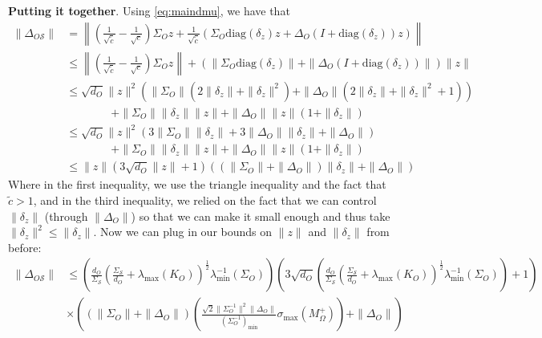 \documentclass[letterpaper]{article}
\begin{document}
\begin{appendix}
{\bf Putting it together}.
Using \eqref{eq:maindmu}, we have that
\begin{align*}
	\|\Delta_{O\mathcal{S}} \|
	&=
	\left \| \left(\frac{1}{\sqrt{\tilde{c}}}-\frac{1}{\sqrt{c}} \right)\Sigma_Oz +  \frac{1}{\sqrt{\tilde{c}}} \left( \Sigma_O\text{diag}(\delta_z)z + \Delta_O(I+\text{diag}(\delta_z))z \right) \right\| \\
	&\leq 
	\left\|  \left(\frac{1}{\sqrt{\tilde{c}}}-\frac{1}{\sqrt{c}} \right)\Sigma_Oz \right \| + \left( \| \Sigma_O\text{diag}(\delta_z) \| + \|\Delta_O(I+\text{diag}(\delta_z))  \| \right) \|z\| \\
	&\leq
	\sqrt{d_O}\|z\|^2 \left( 
		\|\Sigma_O\| \left( 2\|\delta_z\| + \|\delta_z\|^2 \right)
		+ \|\Delta_O\| \left( 2\|\delta_z\| + \|\delta_z\|^2 + 1\right)
	\right)\\
	&\qquad \qquad
	+ \| \Sigma_O \| \|\delta_z\| \|z\|
	+ \|\Delta_O\| \|z\| (1 + \|\delta_z\|)\\
	&\leq
	\sqrt{d_O}\|z\|^2 \left( 
		3 \|\Sigma_O\| \|\delta_z\|
		+ 3 \|\Delta_O\| \|\delta_z\|
		+ \|\Delta_O\|
	\right)\\
	&\qquad \qquad
	+ \| \Sigma_O \| \|\delta_z\| \|z\|
	+ \|\Delta_O\| \|z\| (1 + \|\delta_z\|)\\
	&\leq
	\|z\| \left( 3\sqrt{d_O}\|z\| + 1 \right)
	\left(
		(\|\Sigma_O\| + \|\Delta_O\|) \|\delta_z\|
		+ \|\Delta_O\|
	\right)
\end{align*}
Where in the first inequality, we use the triangle inequality and the fact that $\tilde{c} > 1$, and in the third inequality, we relied on the fact that we can control $\|\delta_z\|$ (through $\|\Delta_O\|$) so that we can make it small enough and thus take $\|\delta_z\|^2 \leq \|\delta_z\|$.
Now we can plug in our bounds on $\|z\|$ and $\|\delta_z\|$ from before:
\begin{align*}
	\|\Delta_{O\mathcal{S}} \|
	&\leq
	\left(
		\frac{d_O}{\Sigma_{\mathcal{S}}} \left( 
			\frac{\Sigma_{\mathcal{S}}}{d_O}
			+ \lambda_{\textrm{max}}(K_O)
		\right)^{\frac12}
		\lambda_{\textrm{min}}^{-1}(\Sigma_O)
	\right)
	\left(
		3\sqrt{d_O}\left(
			\frac{d_O}{\Sigma_{\mathcal{S}}} \left( 
				\frac{\Sigma_{\mathcal{S}}}{d_O}
				+ \lambda_{\textrm{max}}(K_O)
			\right)^{\frac12}
			\lambda_{\textrm{min}}^{-1}(\Sigma_O)
		\right)
		+ 1
	\right)\\
	&\times
	\left(
		(\|\Sigma_O\| + \|\Delta_O\|) \left( \frac{ \sqrt{2}\|\Sigma_O^{-1}\|^2 \|\Delta_O\|}{(\Sigma_O^{-1})_{\min}} \sigma_{\max}(M_\Omega^+) \right)
		+ \|\Delta_O\|
	\right)
\end{align*}


\end{appendix}
\end{document}

